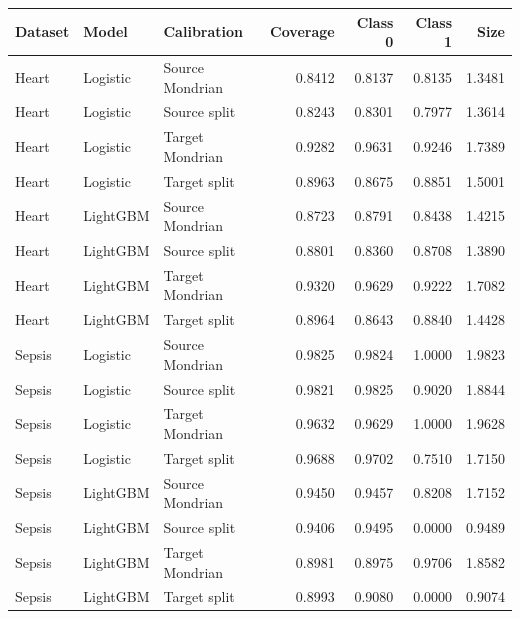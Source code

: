 \begin{tabular}{lllrrrr}
\toprule
Dataset & Model & Calibration & Coverage & Class 0 & Class 1 & Size \\
\midrule
Heart & Logistic & Source Mondrian & 0.8412 & 0.8137 & 0.8135 & 1.3481 \\
Heart & Logistic & Source split & 0.8243 & 0.8301 & 0.7977 & 1.3614 \\
Heart & Logistic & Target Mondrian & 0.9282 & 0.9631 & 0.9246 & 1.7389 \\
Heart & Logistic & Target split & 0.8963 & 0.8675 & 0.8851 & 1.5001 \\
Heart & LightGBM & Source Mondrian & 0.8723 & 0.8791 & 0.8438 & 1.4215 \\
Heart & LightGBM & Source split & 0.8801 & 0.8360 & 0.8708 & 1.3890 \\
Heart & LightGBM & Target Mondrian & 0.9320 & 0.9629 & 0.9222 & 1.7082 \\
Heart & LightGBM & Target split & 0.8964 & 0.8643 & 0.8840 & 1.4428 \\
Sepsis & Logistic & Source Mondrian & 0.9825 & 0.9824 & 1.0000 & 1.9823 \\
Sepsis & Logistic & Source split & 0.9821 & 0.9825 & 0.9020 & 1.8844 \\
Sepsis & Logistic & Target Mondrian & 0.9632 & 0.9629 & 1.0000 & 1.9628 \\
Sepsis & Logistic & Target split & 0.9688 & 0.9702 & 0.7510 & 1.7150 \\
Sepsis & LightGBM & Source Mondrian & 0.9450 & 0.9457 & 0.8208 & 1.7152 \\
Sepsis & LightGBM & Source split & 0.9406 & 0.9495 & 0.0000 & 0.9489 \\
Sepsis & LightGBM & Target Mondrian & 0.8981 & 0.8975 & 0.9706 & 1.8582 \\
Sepsis & LightGBM & Target split & 0.8993 & 0.9080 & 0.0000 & 0.9074 \\
\bottomrule
\end{tabular}
